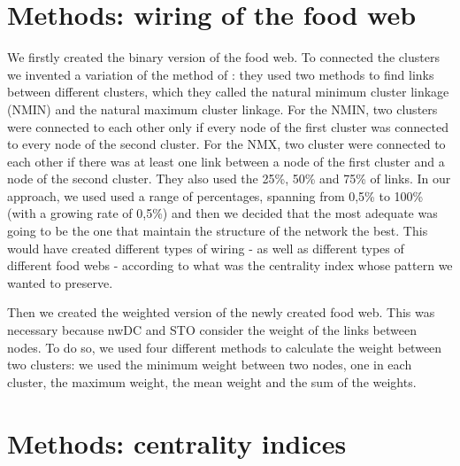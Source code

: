 \documentclass[twocolumn]{article}
\begin{document}
\section*{Methods: wiring of the food web}
        \par We firstly created the binary version of the food web. To connected the clusters we invented a variation of the method of \citet{Martinez1991}: they used two methods to find links between different clusters, which they called the natural minimum cluster linkage (NMIN) and the natural maximum cluster linkage. For the NMIN, two clusters were connected to each other only if every node of the first cluster was connected to every node of the second cluster. For the NMX, two cluster were connected to each other if there was at least one link between a node of the first cluster and a node of the second cluster. They also used the 25\%, 50\% and 75\% of links. In our approach, we used used a range of percentages, spanning from 0,5\% to 100\% (with a growing rate of 0,5\%) and then we decided that the most adequate was going to be the one that maintain the structure of the network the best. This would have created different types of wiring - as well as different types of different food webs - according to what was the centrality index whose pattern we wanted to preserve. 
        \par Then we created the weighted version of the newly created food web. This was necessary because nwDC and STO consider the weight of the links between nodes. To do so, we used four different methods to calculate the weight between two clusters: we used the minimum weight between two nodes, one in each cluster, the maximum weight, the mean weight and the sum of the weights. 
\section*{Methods: centrality indices}
\end{document}
